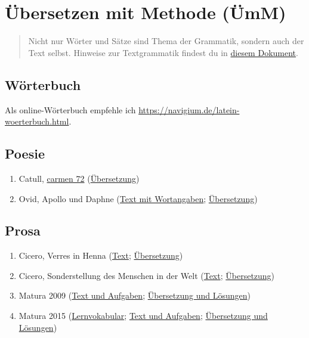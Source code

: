 \documentclass{scrartcl}
\begin{document}
\section{Übersetzen mit Methode (ÜmM)}
\label{sec:org172e68d}
\begin{quote}
Nicht nur Wörter und Sätze sind Thema der Grammatik, sondern auch der Text selbst. Hinweise zur Textgrammatik findest du in \href{https://www.dropbox.com/s/fbswvhejksw6kl6/pronomina.pdf?dl=0}{diesem Dokument}.
\end{quote}

\subsection{Wörterbuch}
\label{sec:orgb41f3a4}
Als online-Wörterbuch empfehle ich \url{https://navigium.de/latein-woerterbuch.html}.

\subsection{Poesie}
\label{sec:orga81e8a4}
\begin{enumerate}
\item Catull, \href{https://www.dropbox.com/s/kc2coqw11nfxyj1/Catull72.pdf?dl=0}{carmen 72} (\href{http://www.gottwein.de/Lat/catull/catull072.php}{Übersetzung})
\item Ovid, Apollo und Daphne (\href{https://www.dropbox.com/s/g60dha8uuh5h0po/OVIDApolloDaphne.pdf?dl=0}{Text mit Wortangaben}; \href{https://www.dropbox.com/s/366v4v48njyzebm/\%25C3\%259CApollDaphne.pdf?dl=0}{Übersetzung})
\end{enumerate}

\subsection{Prosa}
\label{sec:org1caa86c}
\begin{enumerate}
\item Cicero, Verres in Henna (\href{https://www.dropbox.com/s/gqrgxo7yjxglmdv/Matura\_LatInt\_schriftlich\_2016.pdf?dl=0}{Text}; \href{https://www.dropbox.com/s/h6y42hky2w0o2x9/\%25C3\%259Cbersetzung.pdf?dl=0}{Übersetzung})
\item Cicero, Sonderstellung des Menschen in der Welt (\href{https://www.dropbox.com/s/22oxzqeor9vqb67/LatIntSchriftlMatura2009.pdf?dl=0}{Text}; \href{https://www.dropbox.com/s/ieihesw9h0rkejd/\%25C3\%259CbersetzungMaturaLatIntensiv2009.pdf?dl=0}{Übersetzung})
\item Matura 2009 (\href{https://www.dropbox.com/s/fnt9bzwl6hklwv6/SPFSchriftlich2009.pdf?dl=0}{Text und Aufgaben}; \href{https://www.dropbox.com/s/hh89pcj1sy28kby/KorrekturSchriftlMaturaSPF2009.pdf?dl=0}{Übersetzung und Lösungen})
\item Matura 2015 (\href{https://www.dropbox.com/s/hl878959yooat32/Voki.pdf?dl=0}{Lernvokabular}; \href{https://www.dropbox.com/s/8qaeceb1qyemfwz/KSS\_Matura2015\_final.pdf?dl=0}{Text und Aufgaben}; \href{https://www.dropbox.com/s/xwvzrif0nu15j8h/Korrketur\_SPF\_Latein\_2015.pdf?dl=0}{Übersetzung und
Lösungen})
\end{enumerate}
\end{document}
